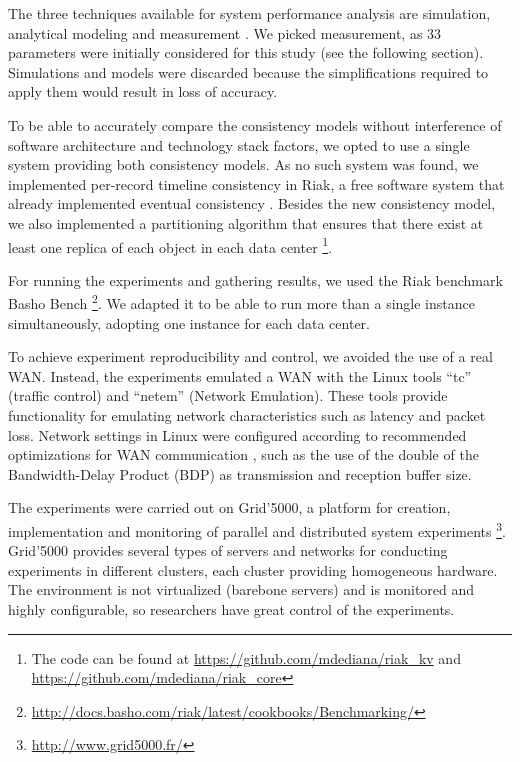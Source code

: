 \documentclass[man,floatsintext,12pt]{apa6}
\begin{document}
The three techniques available for system performance analysis are simulation,
analytical modeling and measurement \parencite{Jain1991}. We picked measurement, as
33 parameters were initially considered for this study (see the following
section). Simulations and models were discarded because the simplifications
required to apply them would result in loss of accuracy.

To be able to accurately compare the consistency models without interference of
software architecture and technology stack factors, we opted to use a single
system providing both consistency models. As no such system was found, we
implemented per-record timeline consistency in Riak, a free software system
that already implemented eventual consistency \parencite{Riak2013}. Besides the
new consistency model, we also implemented a partitioning algorithm that
ensures that there exist at least one replica of each object in each data
center \footnote{The code can be found at
\url{https://github.com/mdediana/riak_kv} and
\url{https://github.com/mdediana/riak_core}}.

For running the experiments and gathering results, we used the Riak benchmark
Basho Bench \footnote{\url{http://docs.basho.com/riak/latest/cookbooks/Benchmarking/}}.
We adapted it to be able to run more than a single instance simultaneously,
adopting one instance for each data center.

To achieve experiment reproducibility and control, we avoided the use of a real
WAN. Instead, the experiments emulated a WAN with the Linux tools ``tc''
(traffic control) and ``netem'' (Network Emulation). These tools provide
functionality for emulating network characteristics such as latency and packet
loss. Network settings in Linux were configured according to recommended
optimizations for WAN communication \parencite{ESnet2012}, such as the use of
the double of the Bandwidth-Delay Product (BDP) as transmission and reception
buffer size.

The experiments were carried out on Grid'5000, a platform for creation,
implementation and monitoring of parallel and distributed system experiments
\footnote{\url{http://www.grid5000.fr/}}. Grid'5000 provides several types of
servers and networks for conducting experiments in different clusters, each
cluster providing homogeneous hardware. The environment is not virtualized
(barebone servers) and is monitored and highly configurable, so researchers
have great control of the experiments.
\end{document}
